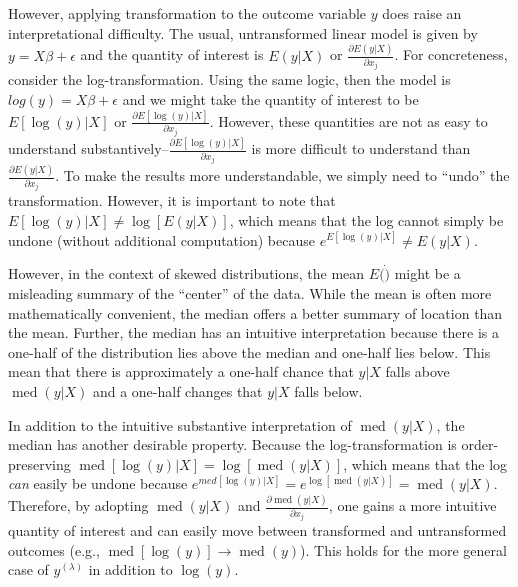 \documentclass[12pt]{article}
\DeclareMathOperator{\med}{med}
\begin{document}
However, applying transformation to the outcome variable $y$ does raise an interpretational difficulty. The usual, untransformed linear model is given by $y = X\beta + \epsilon$ and the quantity of interest is $E(y | X)$ or $\frac{\partial E(y | X)}{\partial x_j}$. For concreteness, consider the log-transformation. Using the same logic, then the model is $log(y) = X\beta + \epsilon$ and we might take the quantity of interest to be $E[\log(y) | X]$ or $\frac{\partial E[\log(y) | X]}{\partial x_j}$. However, these quantities are not as easy to understand substantively--$\frac{\partial E[\log(y) | X]}{\partial x_j}$ is more difficult to understand than $\frac{\partial E(y | X)}{\partial x_j}$. To make the results more understandable, we simply need to ``undo'' the transformation. However, it is important to note that $E[\log(y) | X] \neq \log [E(y | X)]$, which means that the log cannot simply be undone (without additional computation) because $e^{E[\log(y) | X]} \neq E(y | X)$. 

However, in the context of skewed distributions, the mean $E(\dot)$ might be a misleading summary of the ``center'' of the data. While the mean is often more mathematically convenient, the median offers a better summary of location than the mean. Further, the median has an intuitive interpretation because there is a one-half of the distribution lies above the median and one-half lies below. This mean that there is approximately a one-half chance that $y |X$ falls above $\med(y | X)$ and a one-half changes that $y |X$ falls below.

In addition to the intuitive substantive interpretation of $\med(y | X)$, the median has another desirable property. Because the log-transformation is order-preserving $\med[\log(y) | X] = \log [\med(y | X)]$, which means that the log \textit{can} easily be undone because $e^{med[\log(y) | X]} = e^{\log[\med(y | X)]} = \med(y | X)$. Therefore, by adopting $\med(y | X)$ and $\frac{\partial \med(y | X)}{\partial x_j}$, one gains a more intuitive quantity of interest and can easily move between transformed and untransformed outcomes (e.g., $\med[\log(y)] \rightarrow \med(y)$). This holds for the more general case of $y^{(\lambda)}$ in addition to $\log(y)$.
\end{document}

